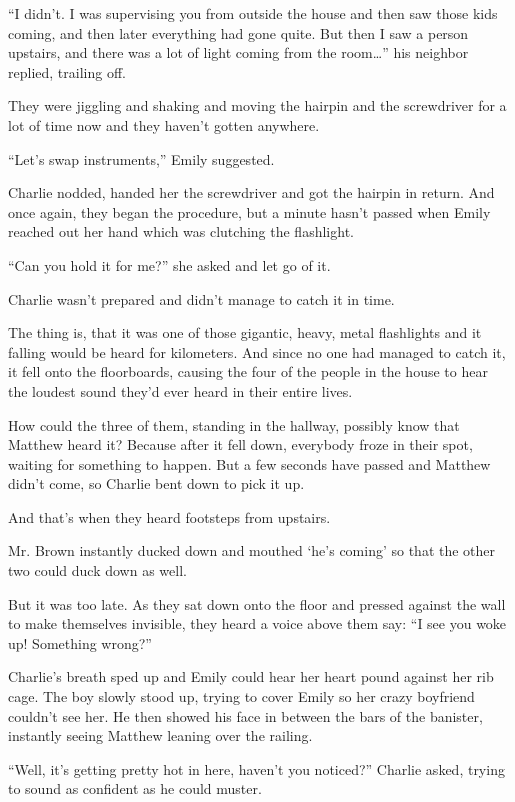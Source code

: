 “I didn’t. I was supervising you from outside the house and then saw those kids coming, and then later everything had gone quite. But then I saw a person upstairs, and there was a lot of light coming from the room…” his neighbor replied, trailing off.

They were jiggling and shaking and moving the hairpin and the screwdriver for a lot of time now and they haven’t gotten anywhere.

“Let’s swap instruments,” Emily suggested.

Charlie nodded, handed her the screwdriver and got the hairpin in return. And once again, they began the procedure, but a minute hasn’t passed when Emily reached out her hand which was clutching the flashlight.

“Can you hold it for me?” she asked and let go of it.

Charlie wasn’t prepared and didn’t manage to catch it in time.

The thing is, that it was one of those gigantic, heavy, metal flashlights and it falling would be heard for kilometers. And since no one had managed to catch it, it fell onto the floorboards, causing the four of the people in the house to hear the loudest sound they’d ever heard in their entire lives.

How could the three of them, standing in the hallway, possibly know that Matthew heard it? Because after it fell down, everybody froze in their spot, waiting for something to happen. But a few seconds have passed and Matthew didn’t come, so Charlie bent down to pick it up.

And that’s when they heard footsteps from upstairs.

Mr. Brown instantly ducked down and mouthed ‘he’s coming’ so that the other two could duck down as well.

But it was too late. As they sat down onto the floor and pressed against the wall to make themselves invisible, they heard a voice above them say:
“I see you woke up! Something wrong?”

Charlie’s breath sped up and Emily could hear her heart pound against her rib cage. The boy slowly stood up, trying to cover Emily so her crazy boyfriend couldn’t see her. He then showed his face in between the bars of the banister, instantly seeing Matthew leaning over the railing.

“Well, it’s getting pretty hot in here, haven’t you noticed?” Charlie asked, trying to sound as confident as he could muster.

